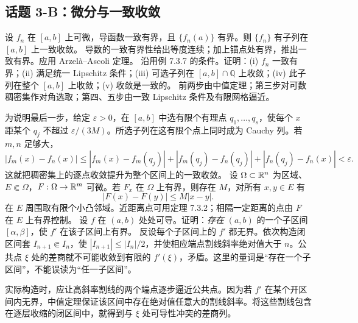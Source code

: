 \subsection*{话题 3-B：微分与一致收敛}
设 $f_n$ 在 $[a,b]$ 上可微，导函数一致有界，且 $\{f_n(a)\}$ 有界。则 $\{f_n\}$ 有子列在 $[a,b]$ 上一致收敛。
\pf 导数的一致有界性给出等度连续；加上锚点处有界，推出一致有界。应用 Arzelà--Ascoli 定理。
沿用例 7.3.7 的条件。证明：(i) $f_n$ 一致有界；(ii) 满足统一 Lipschitz 条件；(iii) 可选子列在 $[a,b]\cap\mathbb Q$ 上收敛；(iv) 此子列在整个 $[a,b]$ 上收敛；(v) 收敛是一致的。
\pf 前两步由中值定理；第三步对可数稠密集作对角选取；第四、五步由一致 Lipschitz 条件及有限网格逼近。
\par 为说明最后一步，给定 $\varepsilon>0$，在 $[a,b]$ 中选有限个有理点 $q_1,\dots,q_s$，使每个 $x$ 距某个 $q_j$ 不超过 $\varepsilon/(3M)$。所选子列在这有限个点上同时成为 Cauchy 列。若 $m,n$ 足够大，
\[|f_m(x)-f_n(x)|\le |f_m(x)-f_m(q_j)|+|f_m(q_j)-f_n(q_j)|+|f_n(q_j)-f_n(x)|<\varepsilon.\]
这就把稠密集上的逐点收敛提升为整个区间上的一致收敛。
设 $\Omega\subset\mathbb R^n$ 为区域、$E\Subset\Omega$，$F:\Omega\to\mathbb R^m$ 可微。若 $F_x$ 在 $\Omega$ 上有界，则存在 $M$，对所有 $x,y\in E$ 有
\[|F(x)-F(y)|\le M|x-y|.\]
\pf 在 $E$ 周围取有限个小凸邻域。近距离点可用定理 7.3.2；相隔一定距离的点由 $F$ 在 $E$ 上有界控制。
设 $f$ 在 $(a,b)$ 处处可导。证明：\emph{存在} $(a,b)$ 的一个子区间 $[\alpha,\beta]$，使 $f'$ 在该子区间上有界。
\pf 反设每个子区间上的 $f'$ 都无界。依次构造闭区间套 $I_{n+1}\Subset I_n$，使 $|I_{n+1}|\le|I_n|/2$，并使相应端点割线斜率绝对值大于 $n$。公共点 $\xi$ 处的差商就不可能收敛到有限的 $f'(\xi)$，矛盾。这里的量词是“存在一个子区间”，不能误读为“任一子区间”。
\par 实际构造时，应让高斜率割线的两个端点逐步逼近公共点。因为若 $f'$ 在某个开区间内无界，中值定理保证该区间中存在绝对值任意大的割线斜率。将这些割线包含在逐层收缩的闭区间中，就得到与 $\xi$ 处可导性冲突的差商列。

